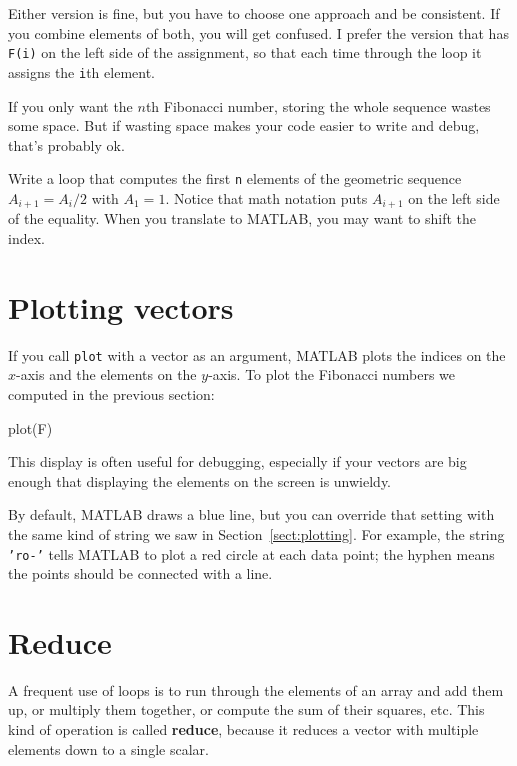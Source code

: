 \documentclass[
]{book}
\numberwithin{Answer}{chapter}
\numberwithin{Exercise}{chapter}
\begin{document}
Either version is fine, but you have to choose one approach
and be consistent.  If you combine elements of both, you will
get confused.  I prefer the version that has {\tt F(i)} on the
left side of the assignment, so that each time through the loop
it assigns the {\tt i}th element.

If you only want the $n$th Fibonacci number, storing
the whole sequence wastes some space.  But if wasting space
makes your code easier to write and debug, that's probably ok.

\begin{ex}
Write a loop that computes the first {\tt n} elements
of the geometric sequence $A_{i+1} = A_i/2$ with $A_1 = 1$.  Notice that
math notation puts $A_{i+1}$ on the left side of the equality.
When you translate to MATLAB, you may want to shift the index.
\end{ex}


\section{Plotting vectors}

If you call {\tt plot} with a vector as an argument,
MATLAB plots the indices on the $x$-axis and the elements on the
$y$-axis.
To plot the Fibonacci numbers we computed in the previous section:

\begin{code}
plot(F)
\end{code}

This display is often useful for debugging, especially
if your vectors are big enough that displaying the elements on
the screen is unwieldy.

By default, MATLAB draws a blue line, but you can override that
setting with the same kind of string we saw in Section~\ref{sect:plotting}.
For example, the string {\tt 'ro-'} tells MATLAB to plot a red circle
at each data point; the hyphen means the points should be connected
with a line.



\section{Reduce}
\label{sect:reduce}

A frequent use of loops is to run through the elements of an array
and add them up, or multiply them together, or compute the sum
of their squares, etc.  This kind of operation is called {\bf reduce},
because it reduces a vector with multiple elements down to a single
scalar.
\end{document}
